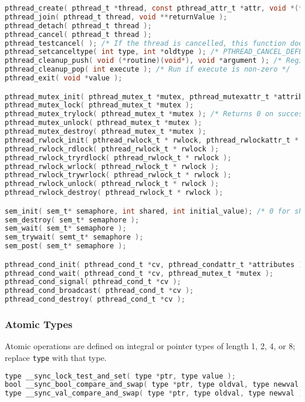 \documentclass[legalpaper,10pt]{article}
\begin{document}
\begin{lstlisting}[language=C]
pthread_create( pthread_t *thread, const pthread_attr_t *attr, void *(*start_routine)( void * ), void *arg );
pthread_join( pthread_t thread, void **returnValue );
pthread_detach( pthread_t thread );
pthread_cancel( pthread_t thread );
pthread_testcancel( ); /* If the thread is cancelled, this function does not return (thread terminated) */
pthread_setcanceltype( int type, int *oldtype ); /* PTHREAD_CANCEL_DEFERRED or PTHREAD_CANCEL_ASYNCHRONOUS */
pthread_cleanup_push( void (*routine)(void*), void *argument ); /* Register cleanup handler, with argument */ 
pthread_cleanup_pop( int execute ); /* Run if execute is non-zero */
pthread_exit( void *value );

pthread_mutex_init( pthread_mutex_t *mutex, pthread_mutexattr_t *attributes );
pthread_mutex_lock( pthread_mutex_t *mutex );
pthread_mutex_trylock( pthread_mutex_t *mutex ); /* Returns 0 on success */
pthread_mutex_unlock( pthread_mutex_t *mutex );
pthread_mutex_destroy( pthread_mutex_t *mutex );
pthread_rwlock_init( pthread_rwlock_t * rwlock, pthread_rwlockattr_t * attr );
pthread_rwlock_rdlock( pthread_rwlock_t * rwlock );
pthread_rwlock_tryrdlock( pthread_rwlock_t * rwlock );
pthread_rwlock_wrlock( pthread_rwlock_t * rwlock );
pthread_rwlock_trywrlock( pthread_rwlock_t * rwlock );
pthread_rwlock_unlock( pthread_rwlock_t * rwlock );
pthread_rwlock_destroy( pthread_rwlock_t * rwlock );

sem_init( sem_t* semaphore, int shared, int initial_value); /* 0 for shared OK */
sem_destroy( sem_t* semaphore );
sem_wait( sem_t* semaphore );
sem_trywait( semt_t* semaphore );
sem_post( sem_t* semaphore );

pthread_cond_init( pthread_cond_t *cv, pthread_condattr_t *attributes );
pthread_cond_wait( pthread_cond_t *cv, pthread_mutex_t *mutex );
pthread_cond_signal( pthread_cond_t *cv );
pthread_cond_broadcast( pthread_cond_t *cv );
pthread_cond_destroy( pthread_cond_t *cv );
\end{lstlisting}

\subsubsection*{Atomic Types}
Atomic operations are defined on integral or pointer types of length 1, 2, 4, or 8; replace \texttt{type} with that type.

\begin{lstlisting}[language=C]
type __sync_lock_test_and_set( type *ptr, type value );
bool __sync_bool_compare_and_swap( type *ptr, type oldval, type newval );
type __sync_val_compare_and_swap( type *ptr, type oldval, type newval );
\end{lstlisting}
\end{document}
